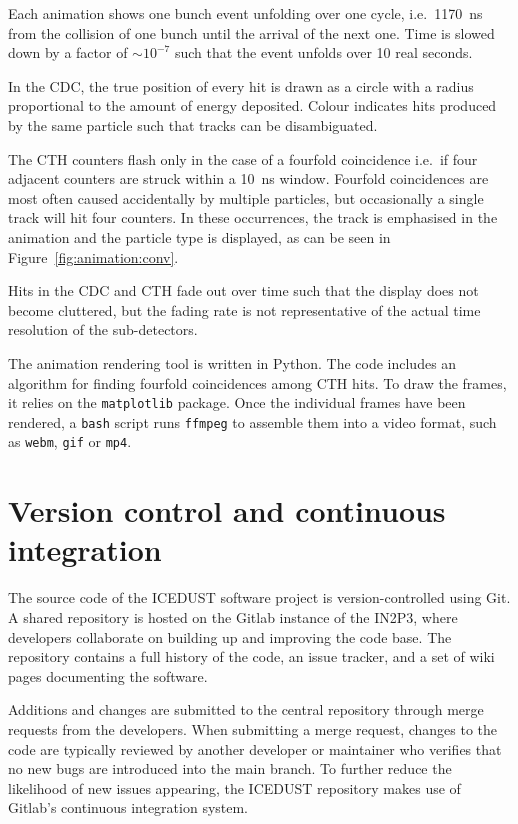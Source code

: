 Each animation shows one bunch event unfolding over one cycle, i.e.\ \SI{1170}{\ns} from the collision of one bunch until the arrival of the next one. Time is slowed down by a factor of ${\sim}10^{-7}$ such that the event unfolds over 10 real seconds.

In the CDC, the true position of every hit is drawn as a circle with a radius proportional to the amount of energy deposited. Colour indicates hits produced by the same particle such that tracks can be disambiguated.

The CTH counters flash only in the case of a fourfold coincidence i.e.\ if four adjacent counters are struck within a \SI{10}{\ns} window.
Fourfold coincidences are most often caused accidentally by multiple particles, but occasionally a single track will hit four counters. In these occurrences, the track is emphasised in the animation and the particle type is displayed, as can be seen in Figure~\ref{fig:animation:conv}.

Hits in the CDC and CTH fade out over time such that the display does not become cluttered, but the fading rate is not representative of the actual time resolution of the sub-detectors.

The animation rendering tool is written in Python. The code includes an algorithm for finding fourfold coincidences among CTH hits. To draw the frames, it relies on the \texttt{matplotlib} package. Once the individual frames have been rendered, a \texttt{bash} script runs \texttt{ffmpeg} to assemble them into a video format, such as \texttt{webm}, \texttt{gif} or \texttt{mp4}.


\section{Version control and continuous integration}

The source code of the ICEDUST software project is version-controlled using Git. A shared repository is hosted on the Gitlab instance of the IN2P3, where developers collaborate on building up and improving the code base. The repository contains a full history of the code, an issue tracker, and a set of wiki pages documenting the software. 

Additions and changes are submitted to the central repository through merge
requests from the developers. When submitting a merge request, changes to the
code are typically reviewed by another developer or maintainer who verifies that
no new bugs are introduced into the main branch. To further reduce the
likelihood of new issues appearing, the ICEDUST repository makes use of Gitlab's
continuous integration system.

